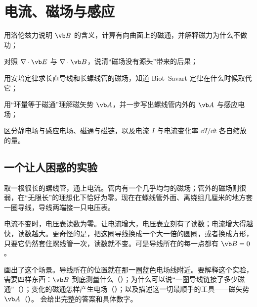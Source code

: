 \chapter{电流、磁场与感应}\label{ch:magnetic}

\begin{chapterguide}
\begin{guidegoals}
\item 用洛伦兹力说明 $\vb B$ 的含义，计算有向曲面上的磁通，并解释磁力为什么不做功；
\item 对照 $\nabla\cdot\vb E$ 与 $\nabla\cdot\vb B$，说清“磁场没有源头”带来的后果；
\item 用安培定律求长直导线和长螺线管的磁场，知道 Biot–Savart 定律在什么时候取代它；
\item 用“环量等于磁通”理解磁矢势 $\vb A$，并一步写出螺线管内外的 $\vb A$ 与感应电场；
\item 区分静电场与感应电场、磁通与磁链，以及电流 $I$ 与电流变化率 $\dd I/\dd t$ 各自缩放的量。
\end{guidegoals}
\end{chapterguide}

\section{一个让人困惑的实验}\label{sec:magnetic-puzzle}

取一根很长的螺线管，通上电流。管内有一个几乎均匀的磁场；管外的磁场则很弱，在“无限长”的理想化下恰好为零。现在在螺线管外面、离绕组几厘米的地方套一圈导线，导线两端接一只电压表。

电流不变时，电压表读数为零。让电流增大，电压表立刻有了读数；电流增大得越快，读数越大。更奇怪的是，把这圈导线换成一个大一倍的圆圈，或者换成方形，只要它仍然套住螺线管一次，读数就不变。可是导线所在的每一点都有 $\vb B=0$。


 画出了这个场景。导线所在的位置就在那一圈蓝色电场线附近。要解释这个实验，需要四样东西：$\vb B$ 到底测量什么（）；为什么可以说“一圈导线链接了多少磁通”（）；变化的磁通怎样产生电场（）；以及描述这一切最顺手的工具——磁矢势 $\vb A$（）。 会给出完整的答案和具体数字。

